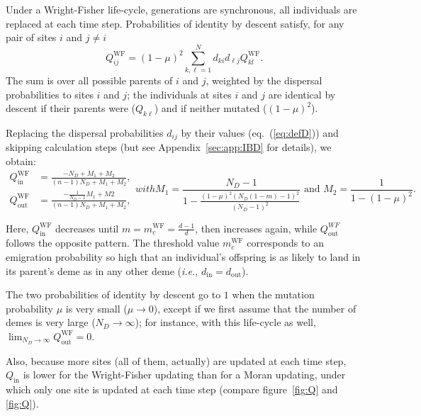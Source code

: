 \documentclass[11pt, letterpaper]{article}
\renewcommand{\eqref}[1]{\textup{{\normalfont eq.~(\ref{#1}}\normalfont)}}
\newcommand{\ie}{\textit{i.e.}}
\newcommand{\appname}[0]{Appendix}
\newcommand{\WF}{\textrm{WF}}
\newcommand{\din}{d_{\textrm{in}}}
\newcommand{\dout}{d_{\textrm{out}}}
\newcommand{\Qin}{Q_{\textrm{in}}}
\newcommand{\Qout}{Q_{\textrm{out}}}
\newcommand{\ndemes}{N_D}
\begin{document}
Under a Wright-Fisher life-cycle, generations are synchronous, all individuals are replaced at each time step. Probabilities of identity by descent satisfy, for any pair of sites $i$ and $j \neq i$
\begin{equation}
Q_{ij}^{\WF} = (1-\mu)^2 \sum_{k,\ell = 1}^N d_{ki} d_{\ell j} Q_{kl}^{\WF}.
\end{equation}
The sum is over all possible parents of $i$ and $j$, weighted by the dispersal probabilities to sites $i$ and $j$; the individuals at sites $i$ and $j$ are identical by descent if their parents were ($Q_{k\ell}$) and if neither mutated ($(1-\mu)^2$). 

Replacing the dispersal probabilities $d_{ij}$ by their values (\eqref{eq:defD}) and skipping calculation steps (but see \appname~\ref{sec:app:IBD} for details), we obtain:
%
\begin{subequations}\label{eq:QWF}
\begin{align}
\Qin^{\WF} &= \frac{-\ndemes + M_1 + M_2}{(n-1) \ndemes +M_1 + M_2}, \\
\Qout^{\WF} & = \frac{-\frac{1}{\ndemes-1}M_1 + M2}{(n-1) \ndemes +M_1 + M_2},
\end{align}
with
\begin{equation*}
M_1 = \frac{\ndemes-1}{1-\frac{(1-\mu )^2 (\ndemes (1-m)-1)^2}{(\ndemes-1)^2}} \textrm{ and }M_2 = \frac{1}{1-(1-\mu)^2}.
\end{equation*}
\end{subequations}

Here, $\Qin^{\WF}$ decreases until $m=m_c^{\WF} = \frac{d-1}{d}$, then increases again, while $\Qout^{WF}$ follows the opposite pattern. The threshold value $m_c^{\WF}$ corresponds to an emigration probability so high that an individual's offspring is as likely to land in its parent's deme as in any other deme (\ie, $\din = \dout$).

The two probabilities of identity by descent go to $1$ when the mutation probability $\mu$ is very small ($\mu \to 0$), except if we first assume that the number of demes is very large ($\ndemes \to \infty$); for instance, with this life-cycle as well, $\lim_{\ndemes \to \infty} \Qout^{\WF} = 0$. 

Also, because more sites (all of them, actually) are updated at each time step, $\Qin$ is lower for the Wright-Fisher updating than for a Moran updating, under which only one site is updated at each time step (compare figure~\ref{fig:Q} and \ref{fig:Q}). 
\end{document}
